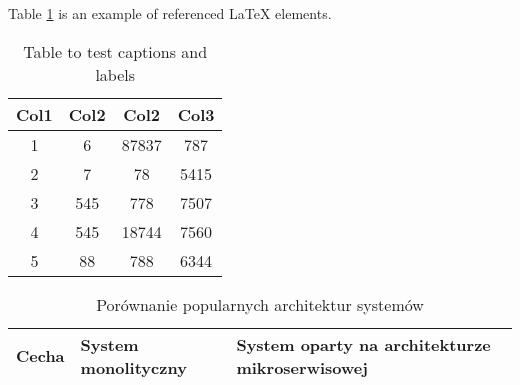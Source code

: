 \documentclass[11pt, a4]{article}
\begin{document}
    Table \ref{table:data} is an example of referenced \LaTeX{} elements.

\begin{table}[h!]
\centering
\begin{tabular}{|c c c c|} 
 \hline
 Col1 & Col2 & Col2 & Col3 \\ [0.5ex] 
 \hline\hline
 1 & 6 & 87837 & 787 \\ 
 2 & 7 & 78 & 5415 \\
 3 & 545 & 778 & 7507 \\
 4 & 545 & 18744 & 7560 \\
 5 & 88 & 788 & 6344 \\ [1ex] 
 \hline
\end{tabular}
\caption{Table to test captions and labels}
\label{table:data}
\end{table}

\begin{table}[!ht]
    \caption{Porównanie popularnych architektur systemów}
    \label{tab:porownanie-architektur}
    \begin{tabularx}{1\textwidth} { 
        | >{\raggedright\arraybackslash}X 
        | >{\centering\arraybackslash}X 
        | >{\raggedleft\arraybackslash}X | }
        \hline
       Cecha & System monolityczny & System oparty na architekturze mikroserwisowej \\
       \hline
    \end{tabularx}
\end{table}
\end{document}
